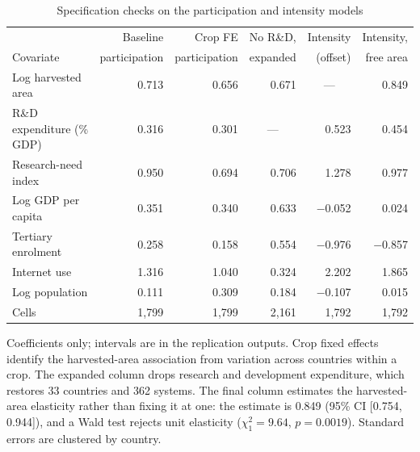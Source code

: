\begin{table}[!t]
\centering
\footnotesize
\caption{Specification checks on the participation and intensity models}
\label{tab:specchecks}
\begin{tabular*}{\textwidth}{@{\extracolsep\fill}l r r r r r@{}}
\toprule
& Baseline & Crop FE & No R\&D, & Intensity & Intensity, \\
Covariate & participation & participation & expanded & (offset) & free area \\
\midrule
Log harvested area & 0.713 & 0.656 & 0.671 & \multicolumn{1}{c}{---} & 0.849 \\
R\&D expenditure (\% GDP) & 0.316 & 0.301 & \multicolumn{1}{c}{---} & 0.523 & 0.454 \\
Research-need index & 0.950 & 0.694 & 0.706 & 1.278 & 0.977 \\
Log GDP per capita & 0.351 & 0.340 & 0.633 & $-$0.052 & 0.024 \\
Tertiary enrolment & 0.258 & 0.158 & 0.554 & $-$0.976 & $-$0.857 \\
Internet use & 1.316 & 1.040 & 0.324 & 2.202 & 1.865 \\
Log population & 0.111 & 0.309 & 0.184 & $-$0.107 & 0.015 \\
\midrule
Cells & 1,799 & 1,799 & 2,161 & 1,792 & 1,792 \\
\bottomrule
\end{tabular*}
\begin{tablenotes}
\item[] Coefficients only; intervals are in the replication outputs. Crop fixed effects identify the harvested-area association from variation across countries within a crop. The expanded column drops research and development expenditure, which restores 33 countries and 362 systems. The final column estimates the harvested-area elasticity rather than fixing it at one: the estimate is 0.849 (95\% CI [0.754, 0.944]), and a Wald test rejects unit elasticity ($\chi^2_1 = 9.64$, $p = 0.0019$). Standard errors are clustered by country.
\end{tablenotes}
\end{table}
